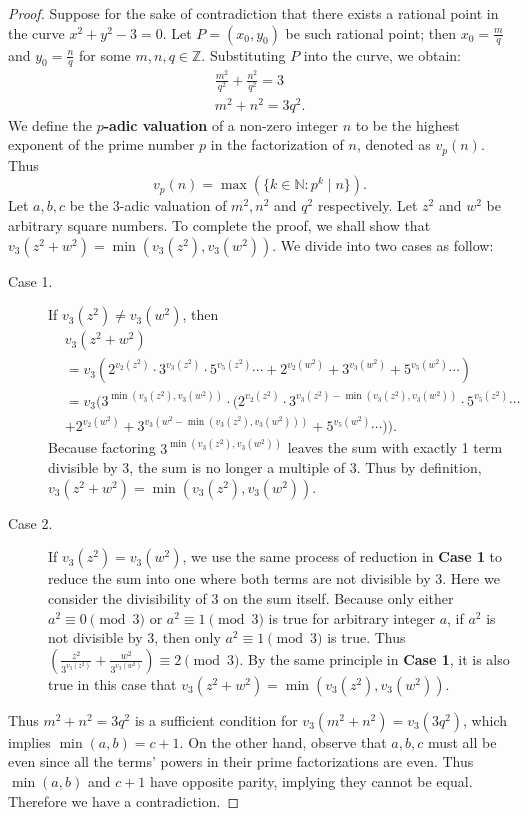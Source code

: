 \documentclass{exam}
\begin{document}
\begin{proof}
    Suppose for the sake of contradiction that there exists a rational point in the curve $x^2 + y^2 - 3 = 0$. Let $P=(x_0, y_0)$ be such rational point; then $x_0 = \frac{m}{q}$ and $y_0 = \frac{n}{q}$ for some $m,n,q\in\mathbb Z$. Substituting $P$ into the curve, we obtain:
    \begin{align*}
        \frac{m^2}{q^2}+\frac{n^2}{q^2} = 3\\
        m^2+n^2 = 3q^2.
    \end{align*}
    We define the \textbf{$p$-adic valuation} of a non-zero integer $n$ to be the highest exponent of the prime number $p$ in the factorization of $n$, denoted as $v_p(n)$. Thus \[
        v_p(n) = \max(\{k\in\mathbb N: p^k\mid n\}).
    \]
    Let $a, b, c$ be the 3-adic valuation of $m^2, n^2$ and $q^2$ respectively. Let $z^2$ and $w^2$ be arbitrary square numbers. To complete the proof, we shall show that $v_3(z^2+w^2) = \min(v_3(z^2), v_3(w^2))$. We divide into two cases as follow:
    \begin{description}
        \item[Case 1. ] If $v_3(z^2)\neq v_3(w^2)$, then
        \begin{align*}
            &v_3(z^2+w^2)\\
            &= v_3(2^{v_2(z^2)}\cdot3^{v_3(z^2)}\cdot5^{v_5(z^2)}\cdots+2^{v_2(w^2)}+3^{v_3(w^2)}+5^{v_5(w^2)}\cdots)\\
            &= v_3(3^{\min(v_3(z^2), v_3(w^2))}\cdot(2^{v_2(z^2)}\cdot3^{v_3(z^2)-\min(v_3(z^2), v_3(w^2))}\cdot5^{v_5(z^2)}\cdots\\
            &+2^{v_2(w^2)}+3^{v_3(w^2 - \min(v_3(z^2), v_3(w^2)))}+5^{v_5(w^2)}\cdots)).
        \end{align*}
        Because factoring $3^{\min(v_3(z^2),v_3(w^2))}$ leaves the sum with exactly 1 term divisible by 3, the sum is no longer a multiple of 3. Thus by definition, $v_3(z^2+w^2) = \min(v_3(z^2), v_3(w^2))$.
        \item[Case 2. ] If $v_3(z^2)= v_3(w^2)$, we use the same process of reduction in \textbf{Case 1} to reduce the sum into one where both terms are not divisible by 3. Here we consider the divisibility of 3 on the sum itself. Because only either $a^2\equiv0\pmod3$ or $a^2\equiv1\pmod3$ is true for arbitrary integer $a$, if $a^2$ is not divisible by 3, then only $a^2\equiv1\pmod3$ is true. Thus $(\frac{z^2}{3^{v_3(z^2)}} + \frac{w^2}{3^{v_3(w^2)}})\equiv2\pmod3$. By the same principle in \textbf{Case 1}, it is also true in this case that $v_3(z^2+w^2)=\min(v_3(z^2),v_3(w^2))$.
    \end{description}
    Thus $m^2+n^2=3q^2$ is a sufficient condition for $v_3(m^2+n^2) = v_3(3q^2)$, which implies $\min(a, b) = c + 1$. On the other hand, observe that $a, b, c$ must all be even since all the terms' powers in their prime factorizations are even. Thus $\min(a,b)$ and $c + 1$ have opposite parity, implying they cannot be equal. Therefore we have a contradiction.
\end{proof}
\end{document}
